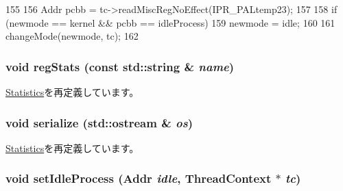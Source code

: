 \begin{DoxyCode}
155 {
156     Addr pcbb = tc->readMiscRegNoEffect(IPR_PALtemp23);
157 
158     if (newmode == kernel && pcbb == idleProcess)
159         newmode = idle;
160 
161     changeMode(newmode, tc);
162 }
\end{DoxyCode}
\hypertarget{classAlphaISA_1_1Kernel_1_1Statistics_a3dd3443357312bcb75580eaa508c48a4}{
\subsubsection[{regStats}]{\setlength{\rightskip}{0pt plus 5cm}void regStats (const std::string \& {\em name})}}
\label{classAlphaISA_1_1Kernel_1_1Statistics_a3dd3443357312bcb75580eaa508c48a4}


\hyperlink{classKernel_1_1Statistics_a3dd3443357312bcb75580eaa508c48a4}{Statistics}を再定義しています。\hypertarget{classAlphaISA_1_1Kernel_1_1Statistics_a53e036786d17361be4c7320d39c99b84}{
\subsubsection[{serialize}]{\setlength{\rightskip}{0pt plus 5cm}void serialize (std::ostream \& {\em os})}}
\label{classAlphaISA_1_1Kernel_1_1Statistics_a53e036786d17361be4c7320d39c99b84}


\hyperlink{classKernel_1_1Statistics_ad6272f80ae37e8331e3969b3f072a801}{Statistics}を再定義しています。\hypertarget{classAlphaISA_1_1Kernel_1_1Statistics_aab8479e51738f53b86d4c67c9a57d6f4}{
\subsubsection[{setIdleProcess}]{\setlength{\rightskip}{0pt plus 5cm}void setIdleProcess ({\bf Addr} {\em idle}, \/  {\bf ThreadContext} $\ast$ {\em tc})}}
\label{classAlphaISA_1_1Kernel_1_1Statistics_aab8479e51738f53b86d4c67c9a57d6f4}



